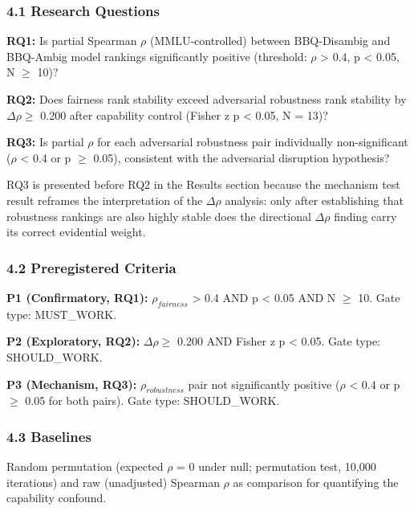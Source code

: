 
\subsubsection{4.1 Research Questions}

\textbf{RQ1:} Is partial Spearman $\rho$ (MMLU-controlled) between BBQ-Disambig and BBQ-Ambig model rankings significantly positive (threshold: $\rho$ > 0.4, p < 0.05, N $\geq$ 10)?

\textbf{RQ2:} Does fairness rank stability exceed adversarial robustness rank stability by $\Delta\rho \geq$ 0.200 after capability control (Fisher z p < 0.05, N = 13)?

\textbf{RQ3:} Is partial $\rho$ for each adversarial robustness pair individually non-significant ($\rho$ < 0.4 or p $\geq$ 0.05), consistent with the adversarial disruption hypothesis?

RQ3 is presented before RQ2 in the Results section because the mechanism test result reframes the interpretation of the $\Delta\rho$ analysis: only after establishing that robustness rankings are also highly stable does the directional $\Delta\rho$ finding carry its correct evidential weight.

\subsubsection{4.2 Preregistered Criteria}

\textbf{P1 (Confirmatory, RQ1):} $\rho_{fairness}$ > 0.4 AND p < 0.05 AND N $\geq$ 10. Gate type: MUST\_WORK.

\textbf{P2 (Exploratory, RQ2):} $\Delta\rho \geq$ 0.200 AND Fisher z p < 0.05. Gate type: SHOULD\_WORK.

\textbf{P3 (Mechanism, RQ3):} $\rho_{robustness}$ pair not significantly positive ($\rho$ < 0.4 or p $\geq$ 0.05 for both pairs). Gate type: SHOULD\_WORK.

\subsubsection{4.3 Baselines}

Random permutation (expected $\rho$ = 0 under null; permutation test, 10,000 iterations) and raw (unadjusted) Spearman $\rho$ as comparison for quantifying the capability confound.

